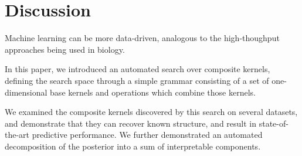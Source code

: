 \documentclass[twoside]{article}
\begin{document}
\section{Discussion}

Machine learning can be more data-driven, analogous to the high-thoughput approaches being used in biology. 

In this paper, we introduced an automated search over composite kernels, defining the search space through a simple grammar consisting of a set of one-dimensional base kernels and operations which combine those kernels.

We examined the composite kernels discovered by this search on several datasets, and demonstrate that they can recover known structure, and result in state-of-the-art predictive performance.  We further demonstrated an automated decomposition of the posterior into a sum of interpretable components.





\end{document}
